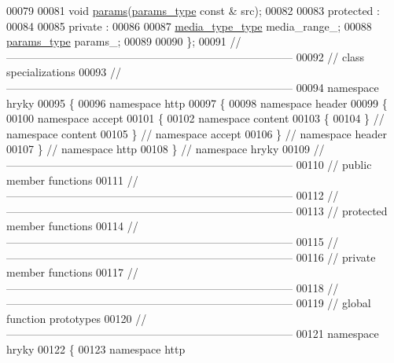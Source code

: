 \begin{DoxyCode}
00079 
00081     \textcolor{keywordtype}{void} \hyperlink{classhryky_1_1http_1_1header_1_1accept_1_1content_1_1_entity_a1a075dd24257f7f53745bc840ffc1c56}{params}(\hyperlink{classhryky_1_1http_1_1header_1_1accept_1_1params_1_1_entity}{params_type} \textcolor{keyword}{const} & src);
00082 
00083 \textcolor{keyword}{protected} :
00084 
00085 \textcolor{keyword}{private} :
00086 
00087     \hyperlink{classhryky_1_1http_1_1header_1_1media__type_1_1_entity}{media_type_type} media\_range\_;
00088     \hyperlink{classhryky_1_1http_1_1header_1_1accept_1_1params_1_1_entity}{params_type} params\_;
00089 
00090 \};
00091 \textcolor{comment}{//
      ------------------------------------------------------------------------------}
00092 \textcolor{comment}{// class specializations}
00093 \textcolor{comment}{//
      ------------------------------------------------------------------------------}
00094 \textcolor{keyword}{namespace }hryky
00095 \{
00096 \textcolor{keyword}{namespace }http
00097 \{
00098 \textcolor{keyword}{namespace }header
00099 \{
00100 \textcolor{keyword}{namespace }accept
00101 \{
00102 \textcolor{keyword}{namespace }content
00103 \{
00104 \} \textcolor{comment}{// namespace content}
00105 \} \textcolor{comment}{// namespace accept}
00106 \} \textcolor{comment}{// namespace header}
00107 \} \textcolor{comment}{// namespace http}
00108 \} \textcolor{comment}{// namespace hryky}
00109 \textcolor{comment}{//
      ------------------------------------------------------------------------------}
00110 \textcolor{comment}{// public member functions}
00111 \textcolor{comment}{//
      ------------------------------------------------------------------------------}
00112 \textcolor{comment}{//
      ------------------------------------------------------------------------------}
00113 \textcolor{comment}{// protected member functions}
00114 \textcolor{comment}{//
      ------------------------------------------------------------------------------}
00115 \textcolor{comment}{//
      ------------------------------------------------------------------------------}
00116 \textcolor{comment}{// private member functions}
00117 \textcolor{comment}{//
      ------------------------------------------------------------------------------}
00118 \textcolor{comment}{//
      ------------------------------------------------------------------------------}
00119 \textcolor{comment}{// global function prototypes}
00120 \textcolor{comment}{//
      ------------------------------------------------------------------------------}
00121 \textcolor{keyword}{namespace }hryky
00122 \{
00123 \textcolor{keyword}{namespace }http

\end{DoxyCode}
